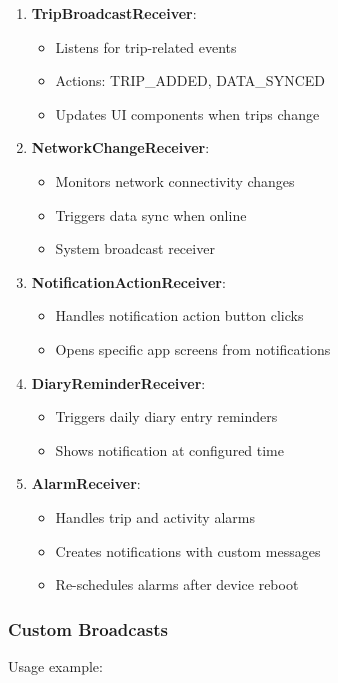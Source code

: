 \documentclass[12pt,a4paper]{article}
\begin{document}
\begin{enumerate}
    \item \textbf{TripBroadcastReceiver}:
    \begin{itemize}
        \item Listens for trip-related events
        \item Actions: TRIP\_ADDED, DATA\_SYNCED
        \item Updates UI components when trips change
    \end{itemize}

    \item \textbf{NetworkChangeReceiver}:
    \begin{itemize}
        \item Monitors network connectivity changes
        \item Triggers data sync when online
        \item System broadcast receiver
    \end{itemize}

    \item \textbf{NotificationActionReceiver}:
    \begin{itemize}
        \item Handles notification action button clicks
        \item Opens specific app screens from notifications
    \end{itemize}

    \item \textbf{DiaryReminderReceiver}:
    \begin{itemize}
        \item Triggers daily diary entry reminders
        \item Shows notification at configured time
    \end{itemize}

    \item \textbf{AlarmReceiver}:
    \begin{itemize}
        \item Handles trip and activity alarms
        \item Creates notifications with custom messages
        \item Re-schedules alarms after device reboot
    \end{itemize}
\end{enumerate}

\subsubsection{Custom Broadcasts}
Usage example:
\end{document}

